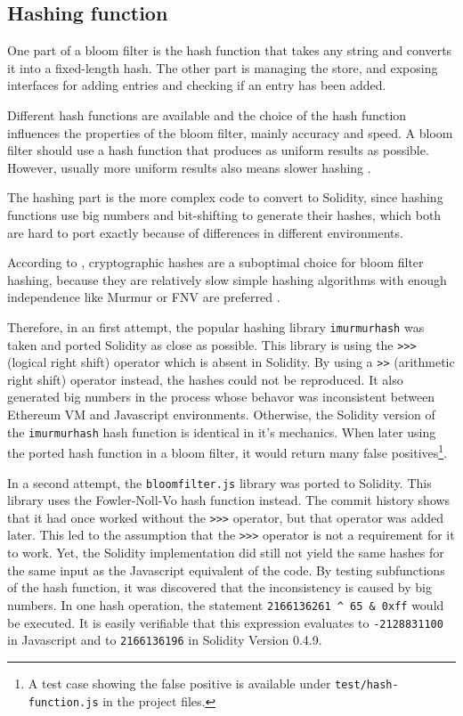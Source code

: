 \subsection{Hashing function}

One part of a bloom filter is the hash function that takes any string and converts it into a fixed-length hash. The other part is managing the store, and exposing interfaces for adding entries and checking if an entry has been added.

Different hash functions are available and the choice of the hash function influences the properties of the bloom filter, mainly accuracy and speed. A bloom filter should use a hash function that produces as uniform results as possible. However, usually more uniform results also means slower hashing \cite{BloomfilterTutorial}.

The hashing part is the more complex code to convert to Solidity, since hashing functions use big numbers and bit-shifting to generate their hashes, which both are hard to port exactly because of differences in different environments.

According to \cite{BloomfilterTutorial}, cryptographic hashes are a suboptimal choice for bloom filter hashing, because they are relatively slow \textemdash{} simple hashing algorithms with enough independence like Murmur or FNV are preferred \cite{BloomfilterHashingPerformance}.

Therefore, in an first attempt, the popular hashing library \texttt{imurmurhash} \cite{imurmur} was taken and ported Solidity as close as possible. This library is using the \texttt{\textgreater{}\textgreater{}\textgreater} (logical right shift) operator which is absent in Solidity. By using a \texttt{\textgreater{}\textgreater} (arithmetic right shift) operator instead, the hashes could not be reproduced. It also generated big numbers in the process whose behavor was inconsistent between Ethereum VM and Javascript environments. Otherwise, the Solidity version of the \texttt{imurmurhash} hash function is identical in it's mechanics.
When later using the ported hash function in a bloom filter, it would return many false positives\footnote{A test case showing the false positive is available under \texttt{test/hash-function.js} in the project files.}.

In a second attempt, the \texttt{bloomfilter.js} \cite{bloomfilterjs} library was ported to Solidity. This library uses the Fowler-Noll-Vo hash function instead. The commit history shows that it had once worked without the \texttt{\textgreater{}\textgreater{}\textgreater} operator, but that operator was added later. This led to the assumption that the \texttt{\textgreater{}\textgreater{}\textgreater} operator is not a requirement for it to work. Yet, the Solidity implementation did still not yield the same hashes for the same input as the Javascript equivalent of the code. By testing subfunctions of the hash function, it was discovered that the inconsistency is caused by big numbers. In one hash operation, the statement \texttt{2166136261 \textasciicircum{} 65 \& 0xff} would be executed. It is easily verifiable that this expression evaluates to \texttt{-2128831100} in Javascript and to \texttt{2166136196} in Solidity Version 0.4.9.

